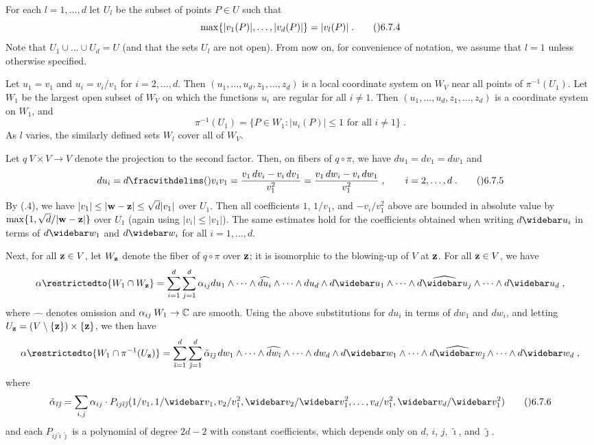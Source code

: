 For each $l=1,\dots,d$ let $U_l$ be the subset of points $P\in U$ such that
$$\max\{|v_1(P)|,\dots,|v_d(P)|\}=|v_l(P)|\;.\tag\06.7.4$$
Note that $U_1\cup\dots\cup U_d=U$ (and that the sets $U_l$ are not open).
From now on, for convenience of notation, we assume that $l=1$ unless
otherwise specified.

Let $u_1=v_1$ and $u_i=v_i/v_1$ for $i=2,\dots,d$.
Then $(u_1,\dots,u_d,z_1,\dots,z_d)$ is a local coordinate system on $W_V$
near all points of $\pi^{-1}(U_1)$.  Let $W_1$ be the largest open subset
of $W_V$ on which the functions $u_i$ are regular for all $i\ne1$.
Then $(u_1,\dots,u_d,z_1,\dots,z_d)$ is a coordinate system on $W_1$, and
$$\pi^{-1}(U_1) = \{P\in W_1:\text{$|u_i(P)|\le1$ for all $i\ne1$}\}\;.$$
As $l$ varies, the similarly defined sets $W_l$ cover all of $W_V$.

Let $q\:V\times V\to V$ denote the projection to the second factor.
Then, on fibers of $q\circ\pi$, we have $du_1=dv_1=dw_1$ and
$$du_i = d\fracwithdelims(){v_i}{v_1} = \frac{v_1\,dv_i - v_i\,dv_1}{v_1^2}
  = \frac{v_1\,dw_i - v_i\,dw_1}{v_1^2}\;,
  \qquad i=2,\dots,d\;.\tag\06.7.5$$
By (.4), we have $|v_1|\le|\bold w-\bold z| \le \sqrt d |v_1|$ over $U_1$.
Then all coefficients $1$, $1/v_1$, and $-v_i/v_1^2$ above
are bounded in absolute value by $\max\{1,\sqrt d/|\bold w-\bold z|\}$
over $U_1$ (again using $|v_i|\le|v_1|$).  The same estimates hold
for the coefficients obtained when writing $d\widebar u_i$
in terms of $d\widebar w_1$ and $d\widebar w_i$ for all $i=1,\dots,d$.

Next, for all $\bold z\in V$, let $W_{\bold z}$ denote the fiber of $q\circ\pi$
over $\bold z$; it is isomorphic to the blowing-up of $V$ at $\bold z$.
For all $\bold z\in V$, we have
$$\alpha\restrictedto{W_1\cap W_{\bold z}}
  = \sum_{i=1}^d \sum_{j=1}^d \alpha_{ij}
    du_1\wedge\dots\wedge\widehat{du_i}\wedge\dots\wedge du_d
    \wedge d\widebar u_1\wedge\dots\wedge\widehat{d\widebar u_j}
      \wedge\dots\wedge d\widebar u_d\;,$$
where $\widehat\quad$ denotes omission and $\alpha_{ij}\:W_1\to\Bbb C$
are smooth.  Using the above substitutions for $du_i$ in terms of $dw_1$
and $dw_i$, and letting $U_{\bold z}=(V\setminus\{\bold z\})\times\{\bold z\}$,
we then have
$$\alpha\restrictedto{W_1\cap \pi^{-1}(U_{\bold z})}
  = \sum_{\tilde\imath=1}^d \sum_{\tilde\jmath=1}^d
    \tilde\alpha_{\tilde\imath\tilde\jmath}\,
    dw_1\wedge\dots\wedge\widehat{dw_{\tilde\imath}}\wedge\dots\wedge dw_d
    \wedge d\widebar w_1\wedge\dots\wedge\widehat{d\widebar w_{\tilde\jmath}}
      \wedge\dots\wedge d\widebar w_d\;,$$
where
$$\tilde\alpha_{\tilde\imath\tilde\jmath}
  = \sum_{i,j} \alpha_{ij}\cdot
    P_{ij\tilde\imath\tilde\jmath}(1/v_1,1/\widebar v_1,
      v_2/v_1^2,\widebar v_2/\widebar v_1^2,\dots,
      v_d/v_1^2,\widebar v_d/\widebar v_1^2)\tag\06.7.6$$
and each $P_{ij\tilde\imath\tilde\jmath}$ is a polynomial
of degree $2d-2$ with constant coefficients, which depends only on $d$,
$i$, $j$, $\tilde\imath$, and $\tilde\jmath$.

